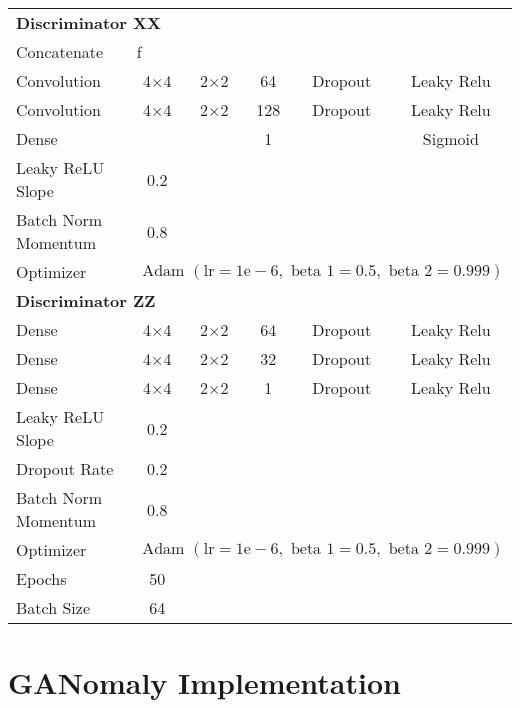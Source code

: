 \begin{longtable}[c]{@{}lccccc@{}}
	\multicolumn{6}{l}{\textbf{Discriminator XX}} \\
	Concatenate &\multicolumn{5}{l}{f} \\
	Convolution & \multicolumn{1}{c}{4$\times$4} & 2$\times$2 & 64 & Dropout & Leaky Relu \\
	Convolution & \multicolumn{1}{c}{4$\times$4} & 2$\times$2 & 128 & Dropout & Leaky Relu \\
	Dense & \multicolumn{1}{c}{} &  & 1 &  & Sigmoid \\ \hline
	Leaky ReLU Slope & 0.2 & \multicolumn{1}{l}{} & \multicolumn{1}{l}{} & \multicolumn{1}{l}{} & \multicolumn{1}{l}{} \\
	Batch Norm Momentum & 0.8 & \multicolumn{1}{l}{} & \multicolumn{1}{l}{} & \multicolumn{1}{l}{} & \multicolumn{1}{l}{} \\
	Optimizer & \multicolumn{5}{l}{$\text { Adam }(\mathrm{lr}=1 \mathrm{e}-6, \text { beta } 1=0.5, \text { beta } 2=0.999)$} \\ \hline
	\multicolumn{6}{l}{\textbf{Discriminator ZZ}} \\
	Dense & \multicolumn{1}{c}{4$\times$4} & 2$\times$2 & 64 & Dropout & Leaky Relu \\
	Dense & \multicolumn{1}{c}{4$\times$4} & 2$\times$2 & 32 & Dropout & Leaky Relu \\
	Dense & \multicolumn{1}{c}{4$\times$4} & 2$\times$2 & 1 & Dropout & Leaky Relu \\ \hline
	Leaky ReLU Slope & 0.2 & \multicolumn{1}{l}{} & \multicolumn{1}{l}{} & \multicolumn{1}{l}{} & \multicolumn{1}{l}{} \\
	Dropout Rate & 0.2 & \multicolumn{1}{l}{} & \multicolumn{1}{l}{} & \multicolumn{1}{l}{} & \multicolumn{1}{l}{} \\
	Batch Norm Momentum & 0.8 & \multicolumn{1}{l}{} & \multicolumn{1}{l}{} & \multicolumn{1}{l}{} & \multicolumn{1}{l}{} \\
	Optimizer & \multicolumn{5}{l}{$\text { Adam }(\mathrm{lr}=1 \mathrm{e}-6, \text { beta } 1=0.5, \text { beta } 2=0.999)$} \\ \hline
	Epochs & 50 & \multicolumn{1}{l}{} & \multicolumn{1}{l}{} & \multicolumn{1}{l}{} & \multicolumn{1}{l}{} \\
	Batch Size & 64 & \multicolumn{1}{l}{} & \multicolumn{1}{l}{} & \multicolumn{1}{l}{} & \multicolumn{1}{l}{} \\ \hline
\end{longtable}


\section{GANomaly Implementation}
\label{app:ganomaly}

